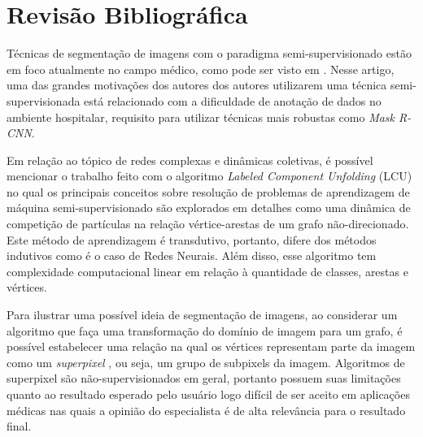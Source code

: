 \chapter{Revisão Bibliográfica}\label{cap:revisao-bibliografica}

Técnicas de segmentação de imagens com o paradigma semi-supervisionado
estão em foco atualmente no campo médico, como pode ser visto em
\cite{LuoSemiSupervised2021}. Nesse artigo, uma das grandes motivações
dos autores dos autores utilizarem uma técnica semi-supervisionada
está relacionado com a dificuldade de anotação de dados no ambiente
hospitalar, requisito para utilizar técnicas mais robustas como
\textit{Mask R-CNN}.

Em relação ao tópico de redes complexas e dinâmicas coletivas, é
possível mencionar o trabalho feito com o algoritmo \textit{Labeled
  Component Unfolding} (\gls{LCU}) \cite{VerriNetworkUnfoldingMap2018} no
qual os principais conceitos sobre resolução de problemas de
aprendizagem de máquina semi-supervisionado são explorados em detalhes
como uma dinâmica de competição de partículas na relação
vértice-arestas de um grafo não-direcionado. Este método de
aprendizagem é transdutivo, portanto, difere dos métodos indutivos
como é o caso de Redes Neurais. Além disso, esse algoritmo tem
complexidade computacional linear em relação à quantidade de classes, arestas e
vértices.

Para ilustrar uma possível ideia de segmentação de imagens, ao
considerar um algoritmo que faça uma transformação do domínio de imagem para um
grafo, é possível estabelecer uma relação na qual os vértices representam
parte da imagem como um \textit{superpixel}
\cite{SuperpixelSurvey2020}, ou seja, um grupo de subpixels da
imagem. Algoritmos de superpixel são não-supervisionados em geral,
portanto possuem suas limitações quanto ao resultado esperado pelo
usuário \textendash \hfill logo difícil de ser aceito em aplicações médicas
nas quais a opinião do especialista é de alta relevância para o
resultado final.

\begin{figure}[!h]
        \captionsetup{width=8cm}
		\centering
\end{figure}



